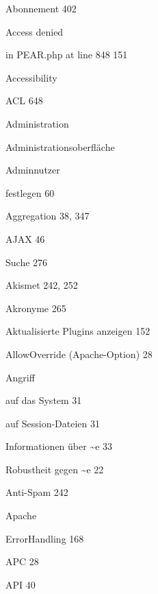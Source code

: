 \documentclass{book}
\renewcommand\subitem{\par}
\begin{document}
\begin{multicols}{2}
\begin{osp-index}
  \item Abonnement\hspace{1mm} 402
  \item Access denied
    \subitem in PEAR.php at line 848\hspace{1mm} 151
  \item Accessibility\hspace{1mm} 
  \item ACL\hspace{1mm} 648
  \item Administration\hspace{1mm} 
  \item Administrationsoberfl\"ache\hspace{1mm} 
  \item Adminnutzer
    \subitem festlegen\hspace{1mm} 60
  \item Aggregation\hspace{1mm} 38, 347
  \item AJAX\hspace{1mm} 46
    \subitem Suche\hspace{1mm} 276
  \item Akismet\hspace{1mm} 242, 252
  \item Akronyme\hspace{1mm} 265
  \item Aktualisierte Plugins anzeigen\hspace{1mm} 152
  \item AllowOverride (Apache-Option)\hspace{1mm} 28
  \item Angriff
    \subitem auf das System\hspace{1mm} 31
    \subitem auf Session-Dateien\hspace{1mm} 31
    \subitem Informationen \"uber \textasciitilde{}e\hspace{1mm} 33
    \subitem Robustheit gegen \textasciitilde {}e\hspace{1mm} 22
  \item Anti-Spam\hspace{1mm} 242
  \item Apache
    \subitem ErrorHandling\hspace{1mm} 168
  \item APC\hspace{1mm} 28
  \item API\hspace{1mm} 40

\end{osp-index}
\end{multicols}
\end{document}
